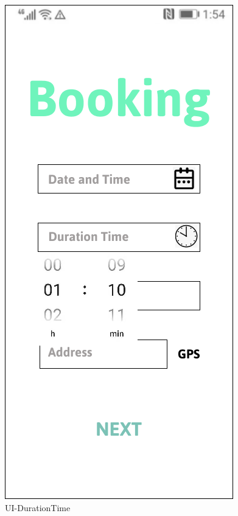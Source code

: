 \documentclass[a4paper,12pt]{report}
\begin{document}
\begin{figure}[H]
	\begin{minipage}[t]{0.56\linewidth}
		\centering
		\includegraphics[scale=0.5]{UI-DurationTime}
		\caption{UI-DurationTime}
		\label{fig:UI-DurationTime}
	\end{minipage}%
	\begin{minipage}[t]{0.56\linewidth}
		\centering

\end{minipage}
\end{figure}
\end{document}
